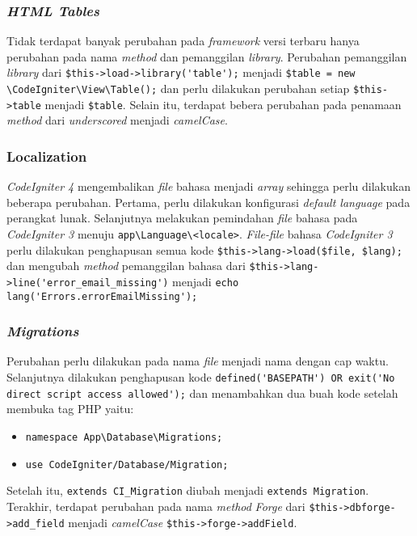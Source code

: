 \subsubsection{\textit{HTML Tables}}

Tidak terdapat banyak perubahan pada \textit{framework} versi terbaru hanya perubahan pada nama \textit{method} dan pemanggilan \textit{library}. Perubahan pemanggilan \textit{library} dari \verb|$this->load->library('table');| menjadi \verb|$table = new \CodeIgniter\View\Table();| dan perlu dilakukan perubahan setiap \verb|$this->table| menjadi \verb|$table|. Selain itu, terdapat bebera perubahan pada penamaan \textit{method} dari \textit{underscored} menjadi \textit{camelCase}.


\subsubsection{Localization}

\textit{CodeIgniter 4} mengembalikan \textit{file} bahasa menjadi \textit{array} sehingga perlu dilakukan beberapa perubahan. Pertama, perlu dilakukan konfigurasi \textit{default language} 
pada perangkat lunak. Selanjutnya melakukan pemindahan \textit{file} bahasa pada \textit{CodeIgniter 3} menuju \verb|app\Language\<locale>|. \textit{File-file} bahasa \textit{CodeIgniter 3} perlu dilakukan penghapusan semua kode \verb|$this->lang->load($file, $lang);| dan mengubah \textit{method} pemanggilan bahasa dari \verb|$this->lang->line('error_email_missing')| menjadi \verb|echo lang('Errors.errorEmailMissing');|
 
\subsubsection{\textit{Migrations}}

Perubahan perlu dilakukan pada nama \textit{file} menjadi nama dengan cap waktu. Selanjutnya dilakukan penghapusan kode \verb|defined('BASEPATH') OR exit('No direct script access allowed');| dan menambahkan dua buah kode setelah membuka tag PHP yaitu:
\begin{itemize}
	\item \verb|namespace App\Database\Migrations;|
	\item \texttt{use CodeIgniter/Database/Migration;}
\end{itemize}
  Setelah itu, \verb|extends CI_Migration| diubah menjadi \verb|extends Migration|. Terakhir, terdapat perubahan pada nama \textit{method} \textit{Forge} dari \verb|$this->dbforge->add_field| menjadi \textit{camelCase} \verb|$this->forge->addField|.

